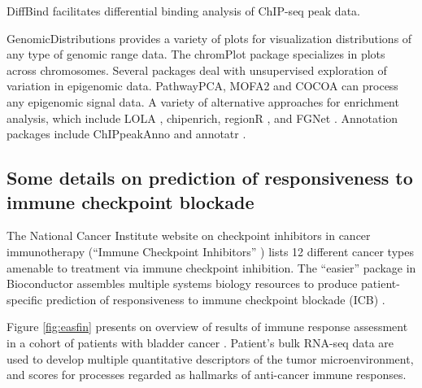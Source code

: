 DiffBind \cite{Stark2011} %
facilitates differential binding analysis of ChIP-seq peak data.

GenomicDistributions \cite{Kupkova2022} %
provides a variety of plots for visualization
distributions of any type of genomic range data. The chromPlot package specializes
in plots across chromosomes.  Several packages deal with
unsupervised exploration of variation in epigenomic data. PathwayPCA, MOFA2 \cite{Argelaguet2020} %
and COCOA \cite{Lawson2020} %
can process any epigenomic signal data.
A variety of alternative approaches for enrichment analysis, which include LOLA \cite{Sheffield2016}, %
chipenrich, regionR \cite{Gel2015}, %
and FGNet \cite{Aibar2015}. %
Annotation packages include ChIPpeakAnno \cite{Zhu2010} %
and annotatr \cite{Cavalcante2017}.%


\subsection{Some details on prediction of responsiveness to immune checkpoint blockade}\label{some-details-on-prediction-of-responsiveness-to-immune-checkpoint-blockade}

The National Cancer Institute website on checkpoint inhibitors
in cancer immunotherapy (``Immune Checkpoint Inhibitors'' 
\cite{ICBnci}) %
lists 12 different cancer types
amenable to treatment via immune checkpoint inhibition.
The ``easier'' package in Bioconductor
assembles multiple systems biology resources
to produce patient-specific
prediction of responsiveness to
immune checkpoint blockade (ICB) \cite{easierPap}. %

Figure \ref{fig:easfin} presents on overview of results of
immune response assessment in a cohort of patients with
bladder cancer \cite{Mariathasan2018}. %
Patient's bulk RNA-seq data are used to develop multiple
quantitative descriptors of the tumor microenvironment,
and scores for processes regarded as hallmarks of anti-cancer
immune responses.

